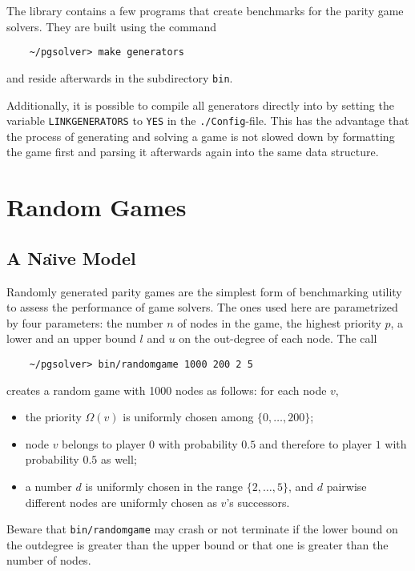 
The \pgsolver library contains a few programs that create benchmarks for the parity game
solvers. They are built using the command
\begin{verbatim}
    ~/pgsolver> make generators
\end{verbatim}
and reside afterwards in the subdirectory \texttt{bin}.

Additionally, it is possible to compile all generators directly into \pgsolver by setting
the variable \texttt{LINKGENERATORS} to \texttt{YES} in the \texttt{./Config}-file. This
has the advantage that the process of generating and solving a game is not slowed down by
formatting the game first and parsing it afterwards again into the same data structure.

\section{Random Games}

\subsection{A Na\"{\i}ve Model}
Randomly generated parity games are the simplest form of benchmarking utility to assess the
performance of game solvers. The ones used here are parametrized by four parameters: the number
$n$ of nodes in the game, the highest priority $p$, a lower and an upper bound $l$ and $u$ on the
out-degree of each node. The call
\begin{verbatim}
    ~/pgsolver> bin/randomgame 1000 200 2 5
\end{verbatim}
creates a random game with 1000 nodes as follows: for each node $v$,
\begin{itemize}
\item the priority $\Omega(v)$ is uniformly chosen among $\{0,\ldots,200\}$;
\item node $v$ belongs to player $0$ with probability $0.5$ and therefore to player $1$ with
      probability $0.5$ as well;
\item a number $d$ is uniformly chosen in the range $\{2,\ldots,5\}$, and $d$ pairwise different
      nodes are uniformly chosen as $v$'s successors.
\end{itemize}
Beware that \texttt{bin/randomgame} may crash or not terminate if the lower bound on the outdegree
is greater than the upper bound or that one is greater than the number of nodes.


